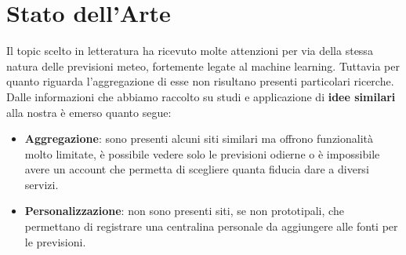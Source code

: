 

\chapter{Stato dell'Arte}
Il topic scelto in letteratura ha ricevuto molte attenzioni per via della stessa natura delle previsioni meteo, fortemente legate al machine learning. Tuttavia per quanto riguarda l'aggregazione di esse non risultano presenti particolari ricerche.
Dalle informazioni che abbiamo raccolto su studi e applicazione di \textbf{idee similari} alla nostra è emerso quanto segue:

\begin{itemize}
    \item \textbf{Aggregazione}: sono presenti alcuni siti similari ma offrono funzionalità molto limitate, è possibile vedere solo le previsioni odierne o è impossibile avere un account che permetta di scegliere quanta fiducia dare a diversi servizi. 
    \item \textbf{Personalizzazione}: non sono presenti siti, se non prototipali, che permettano di registrare una centralina personale da aggiungere alle fonti per le previsioni.
\end{itemize}
 

